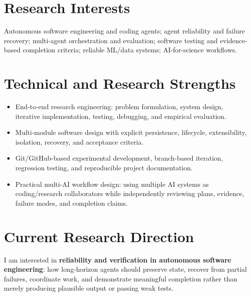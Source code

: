 \documentclass[10pt,a4paper]{article}
\begin{document}
\section{Research Interests}
Autonomous software engineering and coding agents; agent reliability and failure recovery; multi-agent orchestration and evaluation; software testing and evidence-based completion criteria; reliable ML/data systems; AI-for-science workflows.

\section{Technical and Research Strengths}
\begin{itemize}
  \item End-to-end research engineering: problem formulation, system design, iterative implementation, testing, debugging, and empirical evaluation.
  \item Multi-module software design with explicit persistence, lifecycle, extensibility, isolation, recovery, and acceptance criteria.
  \item Git/GitHub-based experimental development, branch-based iteration, regression testing, and reproducible project documentation.
  \item Practical multi-AI workflow design: using multiple AI systems as coding/research collaborators while independently reviewing plans, evidence, failure modes, and completion claims.
\end{itemize}

\section{Current Research Direction}
I am interested in \textbf{reliability and verification in autonomous software engineering}: how long-horizon agents should preserve state, recover from partial failures, coordinate work, and demonstrate meaningful completion rather than merely producing plausible output or passing weak tests.
\end{document}
